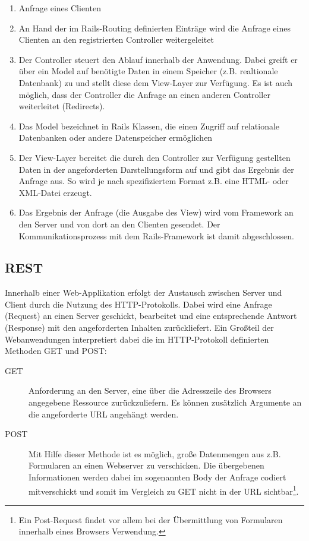 \begin{enumerate}
\item
Anfrage eines Clienten
\item
An Hand der im Rails-Routing definierten Einträge wird die Anfrage eines Clienten an den registrierten Controller weitergeleitet
\item
Der Controller steuert den Ablauf innerhalb der Anwendung. Dabei greift er über ein Model auf benötigte Daten in einem Speicher (z.B. realtionale Datenbank) zu und stellt diese dem View-Layer zur Verfügung. Es ist auch möglich, dass der Controller die Anfrage an einen anderen Controller weiterleitet (Redirects).
\item
Das Model bezeichnet in Rails Klassen, die einen Zugriff auf relationale Datenbanken oder andere Datenspeicher ermöglichen \citep[vgl.][]{Rails2}
\item
Der View-Layer bereitet die durch den Controller zur Verfügung gestellten Daten in der angeforderten Darstellungsform auf und gibt das Ergebnis der Anfrage aus. So wird je nach spezifiziertem Format z.B. eine HTML- oder XML-Datei erzeugt.
\item
Das Ergebnis der Anfrage (die Ausgabe des View) wird vom Framework an den Server und von dort an den Clienten gesendet. Der Kommunikationsprozess mit dem Rails-Framework ist damit abgeschlossen.
\end{enumerate}



\subsection{REST}
Innerhalb einer Web-Applikation erfolgt der Austausch zwischen Server und Client durch die Nutzung des HTTP-Protokolls. Dabei wird eine Anfrage (Request) an einen Server geschickt, bearbeitet und eine entsprechende Antwort (Response) mit den angeforderten Inhalten zurückliefert. Ein Großteil der Webanwendungen interpretiert dabei die im HTTP-Protokoll definierten Methoden GET und POST:

\begin{description}
\item[GET]
Anforderung an den Server, eine über die Adresszeile des Browsers angegebene Ressource zurückzuliefern. Es können zusätzlich Argumente an die angeforderte URL angehängt werden.
\item[POST]
Mit Hilfe dieser Methode ist es möglich,  große Datenmengen aus z.B. Formularen an einen Webserver zu verschicken. Die übergebenen Informationen werden dabei im sogenannten Body der Anfrage codiert mitverschickt und somit im Vergleich zu GET nicht in der URL sichtbar\footnote{Ein Post-Request findet vor allem bei der Übermittlung von Formularen innerhalb eines Browsers Verwendung.}.
\end{description}



